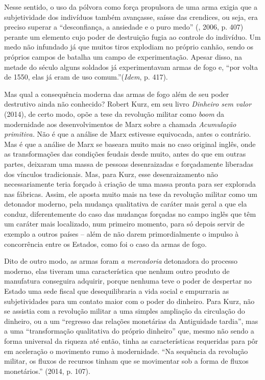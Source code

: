 Nesse sentido, o uso da pólvora como força propulsora de uma arma exigia
que a subjetividade dos indivíduos também avançasse, saísse das
crendices, ou seja, era preciso superar a ``desconfiança, a ansiedade e
o puro medo'' (, 2006, p. 407) perante um elemento cujo poder de
destruição fugia ao controle do indivíduo. Um medo não infundado já que
muitos tiros explodiam no próprio canhão, sendo os próprios campos de
batalha um campo de experimentação. Apesar disso, na metade do século 
alguns soldados já experimentavam armas de fogo e, ``por volta de 1550,
elas já eram de uso comum.''(\emph{Idem}, p. 417).

Mas qual a consequência moderna das armas de fogo além de seu poder
destrutivo ainda não conhecido? Robert Kurz, em seu livro \emph{Dinheiro
sem valor} (2014), de certo modo, opõe a tese da revolução
militar como \emph{boom} da modernidade aos desenvolvimentos de Marx
sobre a chamada \emph{Acumulação primitiva.} Não é que a análise de Marx
estivesse equivocada, antes o contrário. Mas é que a análise de Marx se
baseara muito mais no caso original inglês, onde as transformações das
condições feudais desde muito, antes do que em outras partes, deixaram
uma massa de pessoas desenraizadas e forçadamente liberadas dos vínculos
tradicionais. Mas, para Kurz, esse desenraizamento não necessariamente
teria forçado à criação de uma massa pronta para ser explorada nas
fábricas. Assim, ele aposta muito mais na tese da revolução militar como
um detonador moderno, pela mudança qualitativa de caráter mais geral a
que ela conduz, diferentemente do caso das mudanças forçadas no campo
inglês que têm um caráter mais localizado, num primeiro momento, para só
depois servir de exemplo a outros países -- além de não darem
primordialmente o impulso à concorrência entre os Estados, como foi o
caso da armas de fogo.

Dito de outro modo, as armas foram \emph{a mercadoria} detonadora do
processo moderno, elas tiveram uma característica que nenhum outro
produto de manufatura conseguira adquirir, porque nenhuma teve o poder
de despertar no Estado uma sede fiscal que desequilibraria a vida social
e empurraria as subjetividades para um contato maior com o poder do
dinheiro. Para Kurz, não se assistia com a revolução militar a uma
simples ampliação da circulação do dinheiro, ou a um ``regresso das
relações monetárias da Antiguidade tardia'', mas a uma ``transformação
qualitativa do próprio dinheiro'' que, mesmo não sendo a forma universal
da riqueza até então, tinha as características requeridas para pôr em
aceleração o movimento rumo à modernidade. ``Na sequência da revolução
militar, os fluxos de recursos tinham que se movimentar sob a forma de
fluxos monetários.'' (2014, p. 107).


